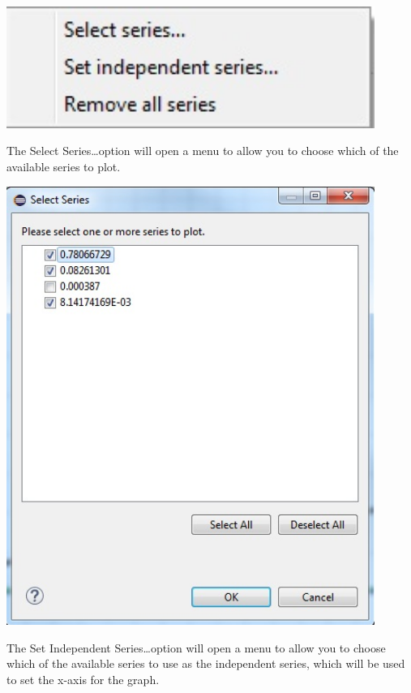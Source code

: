 \documentclass{article}
\begin{document}
\begin{center}
\includegraphics[width=12cm]{images/CSVContextMenu}
\end{center}

The Select Series\ldots option will open a menu to allow you to choose which of
the available series to plot.

\begin{center}
\includegraphics[width=12cm]{images/CSVSelectSeriesDialog}
\end{center}

The Set Independent Series\ldots option will open a menu to allow you to choose
which of the available series to use as the independent series, which will be
used to set the x-axis for the graph.
\end{document}
